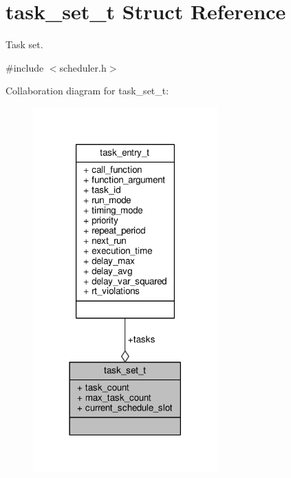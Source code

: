 \hypertarget{structtask__set__t}{\section{task\+\_\+set\+\_\+t Struct Reference}
\label{structtask__set__t}
}


Task set.  




{\ttfamily \#include $<$scheduler.\+h$>$}



Collaboration diagram for task\+\_\+set\+\_\+t\+:
\nopagebreak
\begin{figure}[H]
\begin{center}
\leavevmode
\includegraphics[width=201pt]{structtask__set__t__coll__graph}
\end{center}
\end{figure}
